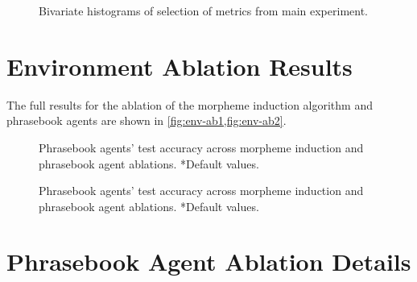 \begin{figure}
  \centering
  \caption{Bivariate histograms of selection of metrics from main experiment.}%
  \label{fig:quant-sum-pair}
\end{figure}


\section{Environment Ablation Results}%
\label{app:env-ab}
The full results for the ablation of the morpheme induction algorithm and phrasebook agents are shown in \cref{fig:env-ab1,fig:env-ab2}.

\begin{figure}
  \centering
  \caption{Phrasebook agents' test accuracy across morpheme induction and phrasebook agent ablations. *Default values.}%
  \label{fig:env-ab1}
\end{figure}

\begin{figure}
  \centering
  \caption{Phrasebook agents' test accuracy across morpheme induction and phrasebook agent ablations. *Default values.}%
  \label{fig:env-ab2}
\end{figure}

\section{Phrasebook Agent Ablation Details}%
\label{app:ag-ab}

